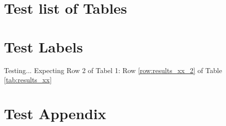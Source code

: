 \documentclass[12pt, a4paper]{article}
\begin{document}
\section{Test list of Tables}
\listoftables

\section{Test Labels}
Testing... Expecting Row 2 of Tabel 1: Row \ref{row:results_xx_2} of Table \ref{tab:results_xx} 

\section{Test Appendix}

\end{document}
